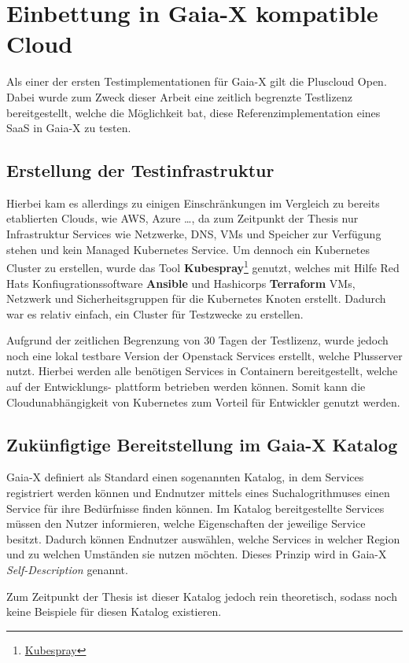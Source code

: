 \chapter{Einbettung in Gaia-X kompatible Cloud}
\label{chapter:gaia-x-einbettung}
Als einer der ersten Testimplementationen für Gaia-X gilt die Pluscloud Open.
Dabei wurde zum Zweck dieser Arbeit eine zeitlich begrenzte Testlizenz bereitgestellt, 
welche die Möglichkeit bat, diese Referenzimplementation eines \ac{SaaS} in Gaia-X zu testen.


\section{Erstellung der Testinfrastruktur}
\label{sec:erstellung-testinfra}
Hierbei kam es allerdings zu einigen Einschränkungen im Vergleich zu bereits etablierten Clouds, 
wie \ac{AWS}, Azure \dots, da zum Zeitpunkt der Thesis nur Infrastruktur Services wie Netzwerke, DNS, \acp{VM} und Speicher 
zur Verfügung stehen und kein Managed Kubernetes Service. Um dennoch ein Kubernetes Cluster zu erstellen,
wurde das Tool \textbf{Kubespray}\footnote{\href{https://github.com/kubernetes-sigs/kubespray}{Kubespray}} genutzt,
welches mit Hilfe Red Hats Konfiugrationssoftware \textbf{Ansible} und Hashicorps \textbf{Terraform} \acp{VM}, Netzwerk und Sicherheitsgruppen
für die Kubernetes Knoten erstellt. Dadurch war es relativ einfach, ein Cluster für Testzwecke zu erstellen.

Aufgrund der zeitlichen Begrenzung von 30 Tagen der Testlizenz, wurde jedoch noch eine lokal 
testbare Version der Openstack Services erstellt, welche Plusserver nutzt.
Hierbei werden alle benötigen Services in Containern bereitgestellt, welche auf der Entwicklungs-
plattform betrieben werden können. 
Somit kann die Cloudunabhängigkeit von Kubernetes zum Vorteil für Entwickler genutzt werden.


\section{Zukünfigtige Bereitstellung im Gaia-X Katalog}
\label{sec:erstellung-testinfra}
Gaia-X definiert als Standard einen sogenannten Katalog, in dem Services registriert werden können und Endnutzer
mittels eines Suchalogrithmuses einen Service für ihre Bedürfnisse finden können. 
Im Katalog bereitgestellte Services müssen den Nutzer informieren, welche Eigenschaften der jeweilige Service besitzt.
Dadurch können Endnutzer auswählen, welche Services in welcher Region und zu welchen Umständen sie nutzen möchten.
Dieses Prinzip wird in Gaia-X \emph{Self-Description} genannt. \cite{Eggers2020}

Zum Zeitpunkt der Thesis ist dieser Katalog jedoch rein theoretisch, sodass noch keine Beispiele für diesen Katalog existieren.
